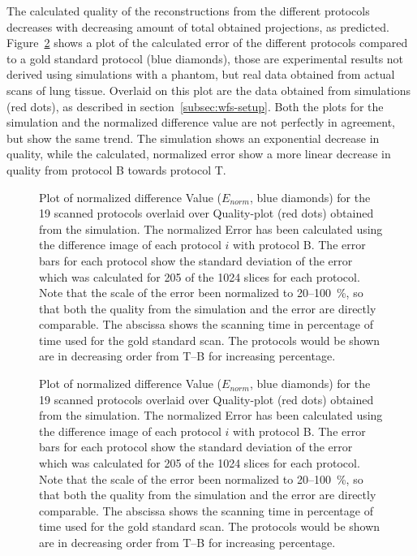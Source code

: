 The calculated quality of the reconstructions from the different protocols decreases with decreasing amount of total obtained projections, as predicted. Figure~\ref{fig:NormalizedErrorPlot} shows a plot of the calculated error of the different protocols compared to a gold standard protocol (blue diamonds), those are experimental results not derived using simulations with a phantom, but real data obtained from actual scans of lung tissue. Overlaid on this plot are the data obtained from simulations (red dots), as described in section~\ref{subsec:wfs-setup}. Both the plots for the simulation and the normalized difference value are not perfectly in agreement, but show the same trend. The simulation shows an exponential decrease in quality, while the calculated, normalized error show a more linear decrease in quality from protocol B towards protocol T.

\ifiucr
	\begin{figure}%
		\centering%
		\caption{Plot of normalized difference Value ($E_{norm}$, blue diamonds) for the 19 scanned protocols overlaid over Quality-plot (red dots) obtained from the simulation. The normalized Error has been calculated using the difference image of each protocol $i$ with protocol B. The error bars for each protocol show the standard deviation of the error which was calculated for 205 of the 1024 slices for each protocol. Note that the scale of the error been normalized to 20--\SI{100}{\percent}, so that both the quality from the simulation and the error are directly comparable. The abscissa shows the scanning time in percentage of time used for the gold standard scan. The protocols would be shown are in decreasing order from T--B for increasing percentage.}%
		\label{fig:NormalizedErrorPlot}%
	\end{figure}%
\else
	\begin{figure}[htp]
		\centering
		
		\caption{Plot of normalized difference Value ($E_{norm}$, blue diamonds) for the 19 scanned protocols overlaid over Quality-plot (red dots) obtained from the simulation. The normalized Error has been calculated using the difference image of each protocol $i$ with protocol B. The error bars for each protocol show the standard deviation of the error which was calculated for 205 of the 1024 slices for each protocol. Note that the scale of the error been normalized to 20--\SI{100}{\percent}, so that both the quality from the simulation and the error are directly comparable. The abscissa shows the scanning time in percentage of time used for the gold standard scan. The protocols would be shown are in decreasing order from T--B for increasing percentage.}%
		\label{fig:NormalizedErrorPlot}
	\end{figure}
\fi

